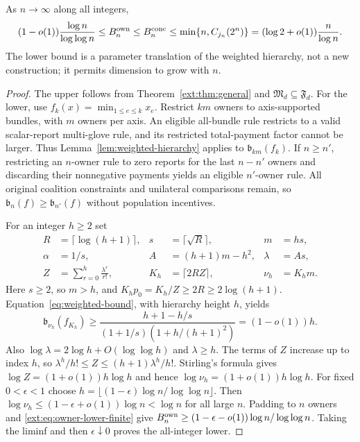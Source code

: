 \begin{theorem}\label{ext:thm:owner-range}
As $n\to\infty$ along all integers,
\[
 (1-o(1))\frac{\log n}{\log\log n}\le B_n^{\rm own}
 \le B_n^{\rm conc}\le\min\{n,C_{j_n}(2^n)\}
       =(\log2+o(1))\frac n{\log n}.
\]
The lower bound is a parameter translation of the weighted hierarchy,
not a new construction; it permits dimension to grow with $n$.
\end{theorem}
\begin{proof}
The upper follows from Theorem~\ref{ext:thm:general} and
$\mathfrak M_d\subseteq\mathfrak F_d$.
For the lower, use $f_k(x)=\min_{1\le e\le k}x_e$.
Restrict $km$ owners to axis-supported bundles, with $m$ owners per axis.
An eligible all-bundle rule restricts to a valid scalar-report multi-glove
rule, and its restricted total-payment factor cannot be larger.
Thus Lemma~\ref{lem:weighted-hierarchy} applies to $\mathfrak b_{km}(f_k)$.
If $n\ge n'$, restricting an $n$-owner rule to zero reports for the last
$n-n'$ owners and discarding their nonnegative payments yields an eligible
$n'$-owner rule.  All original coalition constraints and unilateral comparisons
remain, so $\mathfrak b_n(f)\ge\mathfrak b_{n'}(f)$ without population incentives.

For an integer $h\ge2$ set
\begin{align*}
 R&=\lceil\log(h+1)\rceil, &s&=\lceil\sqrt R\rceil, &m&=hs,\\
 \alpha&=1/s, &A&=(h+1)m-h^2, &\lambda&=As,\\
 Z&=\sum_{r=0}^h\frac{\lambda^r}{r!}, &K_h&=\lceil2RZ\rceil, &\nu_h&=K_hm.
\end{align*}
Here $s\ge2$, so $m>h$, and $K_hp_0=K_h/Z\ge2R\ge2\log(h+1)$.
Equation~\eqref{eq:weighted-bound}, with hierarchy height $h$, yields
\begin{equation}\label{ext:eq:owner-lower-finite}
 \mathfrak b_{\nu_h}(f_{K_h})
 \ge\frac{h+1-h/s}{(1+1/s)(1+h/(h+1)^2)}=(1-o(1))h.
\end{equation}
Also $\log\lambda=2\log h+O(\log\log h)$ and $\lambda\ge h$.
The terms of $Z$ increase up to index $h$, so
$\lambda^h/h!\le Z\le(h+1)\lambda^h/h!$.
Stirling's formula gives $\log Z=(1+o(1))h\log h$ and hence
$\log\nu_h=(1+o(1))h\log h$.
For fixed $0<\epsilon<1$ choose
$h=\lfloor(1-\epsilon)\log n/\log\log n\rfloor$.
Then $\log\nu_h\le(1-\epsilon+o(1))\log n<\log n$ for all large $n$.
Padding to $n$ owners and \eqref{ext:eq:owner-lower-finite} give
$B_n^{\rm own}\ge(1-\epsilon-o(1))\log n/\log\log n$.
Taking the liminf and then $\epsilon\downarrow0$ proves the all-integer lower.
\end{proof}

